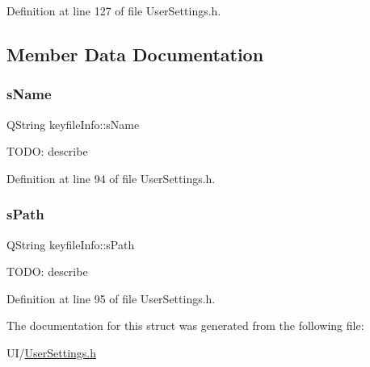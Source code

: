 Definition at line 127 of file User\+Settings.\+h.



\subsection{Member Data Documentation}
\mbox{\label{structkeyfile_info_a137d6535d756973e69e88beae844ad97}} 
\subsubsection{\texorpdfstring{s\+Name}{sName}}
{\footnotesize\ttfamily Q\+String keyfile\+Info\+::s\+Name}

T\+O\+DO\+: describe 

Definition at line 94 of file User\+Settings.\+h.

\mbox{\label{structkeyfile_info_a7435f0bf3c05d8650640bf1f4264bb9d}} 
\subsubsection{\texorpdfstring{s\+Path}{sPath}}
{\footnotesize\ttfamily Q\+String keyfile\+Info\+::s\+Path}

T\+O\+DO\+: describe 

Definition at line 95 of file User\+Settings.\+h.



The documentation for this struct was generated from the following file\+:\begin{DoxyCompactItemize}
\item 
U\+I/\hyperlink{_user_settings_8h}{User\+Settings.\+h}\end{DoxyCompactItemize}
